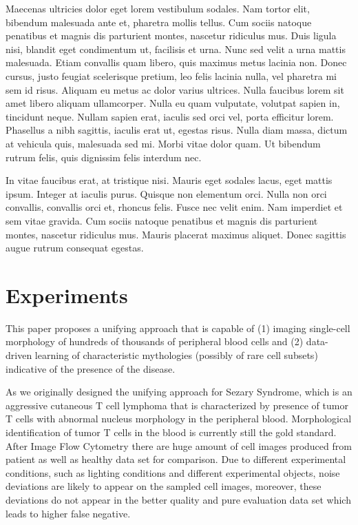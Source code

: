 Maecenas ultricies dolor eget lorem vestibulum sodales. Nam tortor elit, bibendum malesuada ante et, pharetra mollis tellus. Cum sociis natoque penatibus et magnis dis parturient montes, nascetur ridiculus mus. Duis ligula nisi, blandit eget condimentum ut, facilisis et urna. Nunc sed velit a urna mattis malesuada. Etiam convallis quam libero, quis maximus metus lacinia non. Donec cursus, justo feugiat scelerisque pretium, leo felis lacinia nulla, vel pharetra mi sem id risus. Aliquam eu metus ac dolor varius ultrices. Nulla faucibus lorem sit amet libero aliquam ullamcorper. Nulla eu quam vulputate, volutpat sapien in, tincidunt neque. Nullam sapien erat, iaculis sed orci vel, porta efficitur lorem. Phasellus a nibh sagittis, iaculis erat ut, egestas risus. Nulla diam massa, dictum at vehicula quis, malesuada sed mi. Morbi vitae dolor quam. Ut bibendum rutrum felis, quis dignissim felis interdum nec.

In vitae faucibus erat, at tristique nisi. Mauris eget sodales lacus, eget mattis ipsum. Integer at iaculis purus. Quisque non elementum orci. Nulla non orci convallis, convallis orci et, rhoncus felis. Fusce nec velit enim. Nam imperdiet et sem vitae gravida. Cum sociis natoque penatibus et magnis dis parturient montes, nascetur ridiculus mus. Mauris placerat maximus aliquet. Donec sagittis augue rutrum consequat egestas.


\chapter{Experiments}
\label{sec:examples}
This paper proposes a unifying approach that is capable of (1) imaging single-cell morphology of hundreds of thousands of peripheral blood cells and (2) data-driven learning of characteristic mythologies (possibly of rare cell subsets) indicative of the presence of the disease.

As we originally designed the unifying approach for Sezary Syndrome, which is an aggressive cutaneous T cell lymphoma that is characterized by presence of tumor T cells with abnormal nucleus morphology in the peripheral blood. Morphological identification of tumor T cells in the blood is currently still the gold standard.
After Image Flow Cytometry there are huge amount of cell images produced from patient as well as healthy data set for comparison. Due to different experimental conditions, such as lighting conditions and different experimental objects, noise deviations are likely to appear on the sampled cell images, moreover, these deviations do not appear in the better quality and pure evaluation data set which leads to higher false negative.
